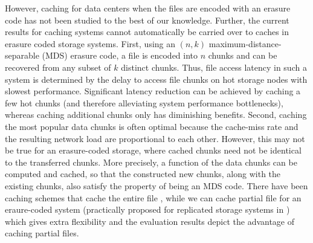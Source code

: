 However, caching for data centers when the files are encoded with an erasure code has not been studied to the best of our knowledge. Further, the current results for caching systems cannot automatically be carried over to caches in erasure coded storage systems. First, using an $(n,k)$ maximum-distance-separable (MDS) erasure code, a file is encoded into $n$ chunks and can be recovered from any subset of $k$ distinct chunks. Thus, file access latency in such a system is determined by the delay to access file chunks on hot storage nodes with slowest performance. Significant latency reduction can be achieved by caching a few hot chunks (and therefore alleviating system performance bottlenecks), whereas caching additional chunks only has diminishing benefits. Second, caching the most popular data chunks is often optimal because the cache-miss rate and the resulting network load are proportional to each other. However, this may not be true for an erasure-coded storage, where cached chunks need not be identical to the transferred chunks. More precisely, a function of the data chunks can be computed and cached, so that the constructed new chunks, along with the existing chunks, also satisfy the property of being an MDS code. There have been caching schemes that cache the entire file  \cite{Nadgowda2014,Chang:2008:BDS:1365815.1365816,Zhu:2004:PSP:1006209.1006221}, while we can cache partial file  for an eraure-coded system (practically proposed for replicated storage systems in \cite{naik2015read}) which gives extra flexibility and the evaluation results depict the advantage of caching partial files.









